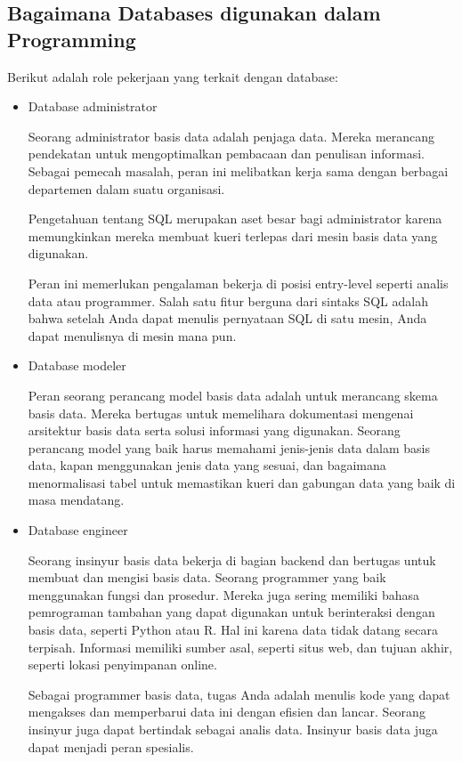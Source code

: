 \documentclass{article}
\begin{document}
\subsection{Bagaimana Databases digunakan dalam Programming}
Berikut adalah role pekerjaan yang terkait dengan database:
\begin{itemize}
      \item Database administrator

            Seorang administrator basis data adalah penjaga data. Mereka merancang pendekatan untuk mengoptimalkan pembacaan dan penulisan informasi. Sebagai pemecah masalah, peran ini melibatkan kerja sama dengan berbagai departemen dalam suatu organisasi.

            Pengetahuan tentang SQL merupakan aset besar bagi administrator karena memungkinkan mereka membuat kueri terlepas dari mesin basis data yang digunakan.

            Peran ini memerlukan pengalaman bekerja di posisi entry-level seperti analis data atau programmer. Salah satu fitur berguna dari sintaks SQL adalah bahwa setelah Anda dapat menulis pernyataan SQL di satu mesin, Anda dapat menulisnya di mesin mana pun.

      \item Database modeler

            Peran seorang perancang model basis data adalah untuk merancang skema basis data. Mereka bertugas untuk memelihara dokumentasi mengenai arsitektur basis data serta solusi informasi yang digunakan. Seorang perancang model yang baik harus memahami jenis-jenis data dalam basis data, kapan menggunakan jenis data yang sesuai, dan bagaimana menormalisasi tabel untuk memastikan kueri dan gabungan data yang baik di masa mendatang.

      \item Database engineer

            Seorang insinyur basis data bekerja di bagian backend dan bertugas untuk membuat dan mengisi basis data. Seorang programmer yang baik menggunakan fungsi dan prosedur. Mereka juga sering memiliki bahasa pemrograman tambahan yang dapat digunakan untuk berinteraksi dengan basis data, seperti Python atau R. Hal ini karena data tidak datang secara terpisah. Informasi memiliki sumber asal, seperti situs web, dan tujuan akhir, seperti lokasi penyimpanan online.

            Sebagai programmer basis data, tugas Anda adalah menulis kode yang dapat mengakses dan memperbarui data ini dengan efisien dan lancar. Seorang insinyur juga dapat bertindak sebagai analis data. Insinyur basis data juga dapat menjadi peran spesialis.


\end{itemize}
\end{document}
